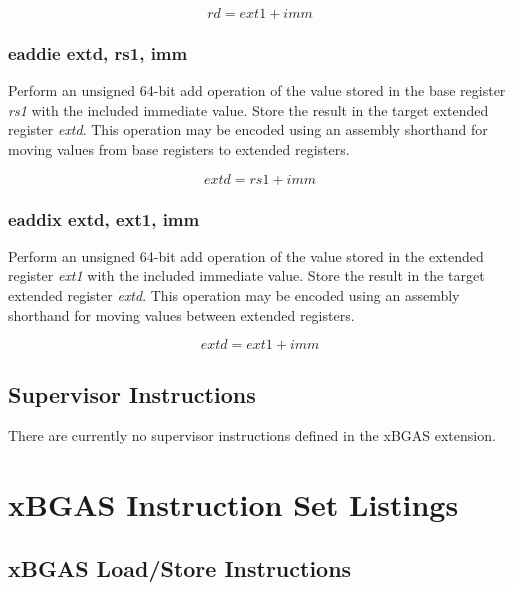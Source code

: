 \documentclass{article}
\begin{document}
\begin{equation}
rd = ext1 + imm
\end{equation}

\subsubsection{eaddie extd, rs1, imm}

Perform an unsigned 64-bit add operation of the value stored in the base 
register \textit{rs1} with the included immediate value.  Store the result in the 
target extended register \textit{extd}.  This operation may be encoded 
using an assembly shorthand for moving values from base registers 
to extended registers.

\begin{equation}
extd = rs1 + imm
\end{equation}

\subsubsection{eaddix extd, ext1, imm}

Perform an unsigned 64-bit add operation of the value stored in the extended
register \textit{ext1} with the included immediate value.  Store the result in the 
target extended register \textit{extd}.  This operation may be encoded using 
an assembly shorthand for moving values between extended registers.  

\begin{equation}
extd = ext1 + imm
\end{equation}

\subsection{Supervisor Instructions}

There are currently no supervisor instructions defined in the xBGAS extension.  

\newpage
\section{xBGAS Instruction Set Listings}

\subsection{xBGAS Load/Store Instructions}
\end{document}
